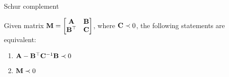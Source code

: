 \documentclass{beamer}
\begin{document}
\begin{frame}{Schur complement}
	\begin{flushleft}
		
		\begin{theorem}
			Given matrix $\mathbf{M} = \begin{bmatrix}
				\mathbf{A} & \mathbf{B} \\
				\mathbf{B}^\top & \mathbf{C}
			\end{bmatrix}$, where $\mathbf{C} \prec 0$, 
			the following statements are equivalent:
			\begin{enumerate}
				\item $\mathbf{A} - \mathbf{B}^\top \mathbf{C}^{-1}\mathbf{B} \prec 0$
				\item $\mathbf{M} \prec 0$
			\end{enumerate}
		\end{theorem}
		
		
		
		
		
		
	\end{flushleft}
\end{frame}
\end{document}
